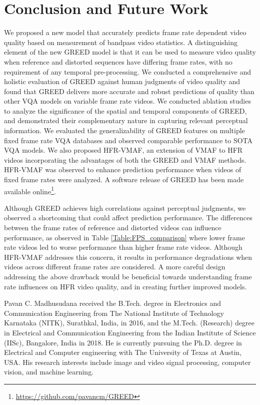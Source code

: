 \documentclass[journal]{IEEEtran}
\begin{document}
\section{Conclusion and Future Work}
\label{sec:conclusion}
We proposed a new model that accurately predicts frame rate dependent video quality based on measurement of bandpass video statistics. A distinguishing element of the new GREED model is that it can be used to measure video quality when reference and distorted sequences have differing frame rates, with no requirement of any temporal pre-processing. We conducted a comprehensive and holistic evaluation of GREED against human judgments of video quality and found that GREED delivers more accurate and robust predictions of quality than other VQA models on variable frame rate videos. We conducted ablation studies to analyze the significance of the spatial and temporal components of GREED, and demonstrated their complementary nature in capturing relevant perceptual information. We evaluated the generalizability of GREED features on multiple fixed frame rate VQA databases and observed comparable performance to SOTA VQA models. We also proposed HFR-VMAF, an extension of VMAF to HFR videos incorporating the advantages of both the GREED and VMAF methods. HFR-VMAF was observed to enhance prediction performance when videos of fixed frame rates were analyzed. A software release of GREED has been made available online\footnote{\url{https://github.com/pavancm/GREED}}.

Although GREED achieves high correlations against perceptual judgments, we observed a shortcoming that could affect prediction performance. The differences between the frame rates of reference and distorted videos can influence performance, as observed in Table \ref{Table:FPS_comparison} where lower frame rate videos led to worse performance than higher frame rate videos. Although HFR-VMAF addresses this concern, it results in performance degradations when videos across different frame rates are considered. A more careful design addressing the above drawback would be beneficial towards understanding frame rate influences on HFR video quality, and in creating further improved models.

\ifCLASSOPTIONcaptionsoff
  \newpage
\fi





\begin{IEEEbiography}{Pavan C. Madhusudana}
received the B.Tech. degree in Electronics and Communication Engineering from The National Institute of Technology Karnataka (NITK), Surathkal, India, in 2016, and the M.Tech. (Research) degree in Electrical and Communication Engineering from the Indian Institute of Science (IISc), Bangalore, India in 2018. He is currently pursuing the Ph.D. degree in Electrical and Computer engineering with The University of Texas at Austin, USA. His research interests include image and video signal processing, computer vision, and machine learning.
\end{IEEEbiography}
\end{document}
